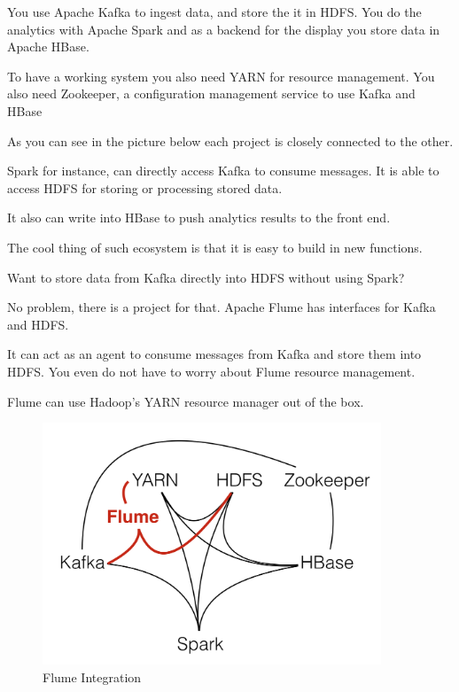 \documentclass[12pt, numbers=noenddot]{scrreprt} %
\begin{document}
You use Apache Kafka to ingest data, and store the it in HDFS. You do the analytics with Apache Spark and as a backend for the display you store data in Apache HBase.

To have a working system you also need YARN for resource management. You also need Zookeeper, a configuration management service to use Kafka and HBase

As you can see in the picture below each project is closely connected to the other.

Spark for instance, can directly access Kafka to consume messages. It is able to access HDFS for storing or processing stored data.

It also can write into HBase to push analytics results to the front end.


The cool thing of such ecosystem is that it is easy to build in new functions.

Want to store data from Kafka directly into HDFS without using Spark?

No problem, there is a project for that. Apache Flume has interfaces for Kafka and HDFS.

It can act as an agent to consume messages from Kafka and store them into HDFS. You even do not have to worry about Flume resource management.

Flume can use Hadoop’s YARN resource manager out of the box.

\begin{figure}[htbp]
  \centering
     \includegraphics[width=0.9\textwidth]{images/Hadoop-Ecosystem-Connections-Flume.png}
  \caption{Flume Integration}
  \label{fig:Bild1}
\end{figure}
\end{document}
